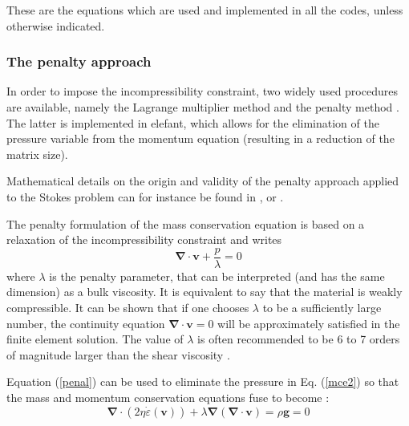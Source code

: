 \documentclass[a4paper]{article}
\begin{document}
These are the equations which are used and implemented in all the codes, unless otherwise
indicated.

\subsubsection{The penalty approach}

In order to impose the incompressibility constraint, two widely used procedures are available, namely the 
Lagrange multiplier method and the penalty method \cite{bathe82,hugh}. The latter is implemented in {\sc elefant}, which allows for the elimination of the pressure variable from the momentum equation (resulting in a reduction of the matrix size).%

Mathematical details on the origin and validity of the penalty approach applied to the Stokes problem can for instance be found in  \cite{cuss86}, \cite{redd82} or \cite{gunz89}.

The penalty formulation of the mass conservation equation is based on a relaxation of the incompressibility constraint and writes 
\begin{equation}
{\bm \nabla}\cdot {\bm v} + \frac{p}{\lambda} = 0 \label{penal}
\end{equation}
where $\lambda$ is the penalty parameter, that can be interpreted (and has the same dimension) as a bulk viscosity. It is 
equivalent to say that the material is weakly compressible. It can be shown that if one chooses $\lambda$ to be a 
sufficiently large number, the continuity equation $ {\bm \nabla}\cdot {\bm v} = 0$ will be approximately satisfied in the finite element solution. The value of $\lambda$ is often recommended to be 6 to 7 orders of magnitude larger than the shear viscosity \cite{dohu03,hulb79}.


Equation (\ref{penal}) can be used to eliminate the pressure in Eq. (\ref{mce2}) so that the mass and momentum conservation equations fuse to become :
\begin{equation}
{\bm \nabla}\cdot ( 2 \eta \dot\varepsilon({\bm v})) + \lambda {\bm \nabla} ({\bm \nabla }\cdot {\bm v}) = \rho {\bm g} = 0 \label{peneq}
\end{equation}
\end{document}
